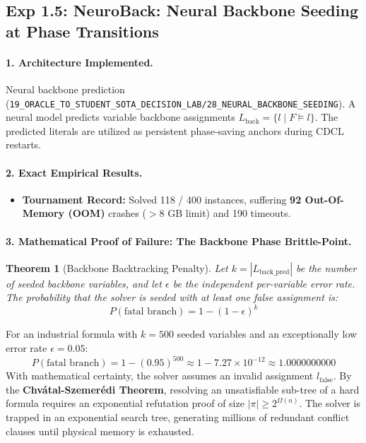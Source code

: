 \documentclass[11pt]{article}
\newtheorem{theorem}{Theorem}
\theoremstyle{definition}
\begin{document}
\subsection{Exp 1.5: NeuroBack: Neural Backbone Seeding at Phase Transitions}
\paragraph{1. Architecture Implemented.}
Neural backbone prediction (\texttt{19\_ORACLE\_TO\_STUDENT\_SOTA\_DECISION\_LAB/28\_NEURAL\_BACKBONE\_SEEDING}). A neural model predicts variable backbone assignments $L_{\text{back}} = \{l \mid F \models l\}$. The predicted literals are utilized as persistent phase-saving anchors during CDCL restarts.

\paragraph{2. Exact Empirical Results.}
\begin{itemize}
    \item \textbf{Tournament Record:} Solved 118 / 400 instances, suffering \textbf{92 Out-Of-Memory (OOM)} crashes ($>8\text{ GB}$ limit) and 190 timeouts.
\end{itemize}

\paragraph{3. Mathematical Proof of Failure: The Backbone Phase Brittle-Point.}
\begin{theorem}[Backbone Backtracking Penalty]
Let $k = |L_{\text{back\_pred}}|$ be the number of seeded backbone variables, and let $\epsilon$ be the independent per-variable error rate. The probability that the solver is seeded with at least one false assignment is:
\begin{equation}
P(\text{fatal branch}) = 1 - (1 - \epsilon)^k
\end{equation}
\end{theorem}
For an industrial formula with $k = 500$ seeded variables and an exceptionally low error rate $\epsilon = 0.05$:
\begin{equation}
P(\text{fatal branch}) = 1 - (0.95)^{500} \approx 1 - 7.27 \times 10^{-12} \approx 1.0000000000
\end{equation}
With mathematical certainty, the solver assumes an invalid assignment $l_{\text{false}}$. By the \textbf{Chvátal-Szemerédi Theorem}, resolving an unsatisfiable sub-tree of a hard formula requires an exponential refutation proof of size $|\pi| \ge 2^{\Omega(n)}$. The solver is trapped in an exponential search tree, generating millions of redundant conflict clauses until physical memory is exhausted.
\end{document}
